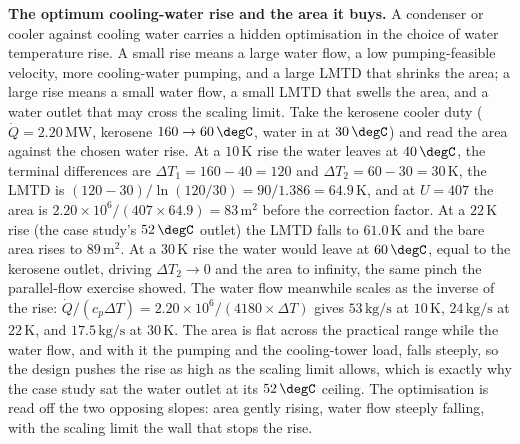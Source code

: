 \textbf{The optimum cooling-water rise and the area it buys.} A condenser or
cooler against cooling water carries a hidden optimisation in the choice of water
temperature rise. A small rise means a large water flow, a low pumping-feasible
velocity, more cooling-water pumping, and a large LMTD that shrinks the area; a
large rise means a small water flow, a small LMTD that swells the area, and a
water outlet that may cross the scaling limit. Take the kerosene cooler duty
($\dot{Q} = 2.20\,\text{MW}$, kerosene $160 \to 60\,\degC$, water in at
$30\,\degC$) and read the area against the chosen water rise. At a $10\,\si{\kelvin}$
rise the water leaves at $40\,\degC$, the terminal differences are $\Delta T_1 =
160 - 40 = 120$ and $\Delta T_2 = 60 - 30 = 30\,\si{\kelvin}$, the LMTD is
$(120 - 30)/\ln(120/30) = 90/1.386 = 64.9\,\si{\kelvin}$, and at $U = 407$ the
area is $2.20\times 10^6/(407\times 64.9) = 83\,\text{m}^2$ before the correction
factor. At a $22\,\si{\kelvin}$ rise (the case study's $52\,\degC$ outlet) the
LMTD falls to $61.0\,\si{\kelvin}$ and the bare area rises to $89\,\text{m}^2$. At
a $30\,\si{\kelvin}$ rise the water would leave at $60\,\degC$, equal to the
kerosene outlet, driving $\Delta T_2 \to 0$ and the area to infinity, the same
pinch the parallel-flow exercise showed. The water flow meanwhile scales as the
inverse of the rise: $\dot{Q}/(c_p\Delta T) = 2.20\times 10^6/(4180\times \Delta
T)$ gives $53\,\text{kg/s}$ at $10\,\si{\kelvin}$, $24\,\text{kg/s}$ at
$22\,\si{\kelvin}$, and $17.5\,\text{kg/s}$ at $30\,\si{\kelvin}$. The area is
flat across the practical range while the water flow, and with it the pumping and
the cooling-tower load, falls steeply, so the design pushes the rise as high as
the scaling limit allows, which is exactly why the case study sat the water outlet
at its $52\,\degC$ ceiling. The optimisation is read off the two opposing slopes:
area gently rising, water flow steeply falling, with the scaling limit the wall
that stops the rise.

